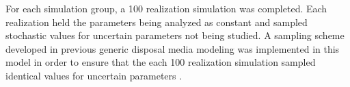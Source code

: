 For each simulation group, a 100 realization simulation was completed. Each
realization held the parameters being analyzed as constant and sampled 
stochastic values for uncertain parameters not being studied.  A sampling scheme 
developed in previous generic disposal media modeling was implemented in this 
model in order to ensure that the each 100 realization simulation sampled 
identical values for uncertain parameters \cite{clayton_generic_2011, 
nutt_generic_2009}.  

